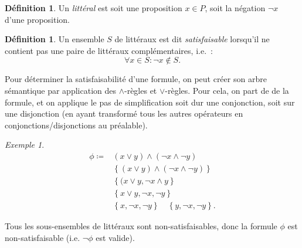 \documentclass{article}
\theoremstyle{definition}
\newtheorem{déf}[thm]{Définition}
\theoremstyle{remark}
\newtheorem{ex}{Exemple}[section]
\begin{document}
	\begin{déf} Un \textit{littéral} est soit une proposition $x \in P$, soit la négation $\lnot x$ d'une proposition.
	\end{déf}

	\begin{déf} Un ensemble $S$ de littéraux est dit \textit{satisfaisable} lorsqu'il ne contient pas une paire de littéraux complémentaires, i.e.~:
	\[\forall x \in S : \lnot x \not \in S.\]
	\end{déf}

	Pour déterminer la satisfaisabilité d'une formule, on peut créer son arbre sémantique par application des $\land$-règles et $\lor$-règles. Pour cela,
	on part de de la formule, et on applique le pas de simplification soit dur une conjonction, soit sur une disjonction (en ayant transformé tous les
	autres opérateurs en conjonctions/disjonctions au préalable).

	\begin{ex}
	\begin{align*}
		\phi \coloneqq &(x \lor y) \land (\lnot x \land \lnot y) \\
		&\left\{(x \lor y) \land (\lnot x \land \lnot y)\right\} \\
		&\left\{(x \lor y, \lnot x \land y\right\} \\
		&\left\{x \lor y, \lnot x, \lnot y\right\} \\
		&\left\{x, \lnot x, \lnot y\right\} \quad  \left\{y, \lnot x, \lnot y\right\}.
	\end{align*}

	Tous les sous-ensembles de littéraux sont non-satisfaisables, donc la formule $\phi$ est non-satisfaisable (i.e. $\lnot \phi$ est valide).
	\end{ex}
\end{document}
